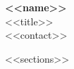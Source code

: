 \documentclass[11pt,letterpaper]{article}
\begin{document}
\begin{center}
    {\huge \textbf{\color{dark} <<name>>}} \\
    \vspace{0.2em}
    {\large \color{accent} <<title>>} \\
    \vspace{0.4em}
    {\small \color{gray} <<contact>>}
\end{center}

\vspace{0.5em}

<<sections>>
\end{document}

